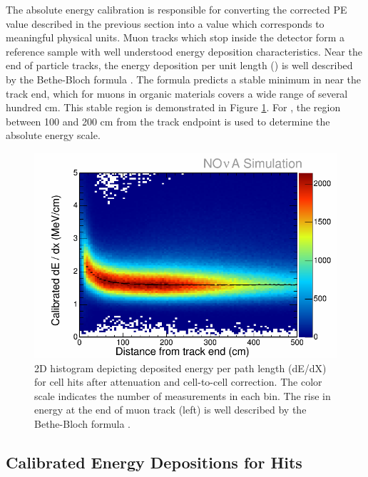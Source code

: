 The absolute energy calibration is responsible for converting the corrected
PE value described in the previous section into a value which corresponds
to meaningful physical units.
Muon tracks which stop inside the detector form a reference sample with well
understood energy deposition characteristics.
Near the end of particle tracks, the energy deposition per unit length
(\dedx) is well described by the Bethe-Bloch formula \cite{pdg}.
The formula predicts a stable minimum in \dedx near the track end,
which for muons in organic materials covers a wide range of several hundred cm.
This stable region is demonstrated in Figure \ref{calib_dEdX}.
For \nova, the region between 100 and 200 cm from the track endpoint is used
to determine the absolute energy scale.

\begin{figure}[t]
\begin{center}
\includegraphics[width=\textwidth]{figures/plots/reco/calib_dEdX.png}
\end{center}
\caption{2D histogram depicting deposited energy per path length (dE/dX) for
cell hits after attenuation and cell-to-cell correction.  The color scale
indicates the number of measurements in each bin.  The rise in energy at the
end of muon track (left) is well described by the Bethe-Bloch formula \cite{pdg}.}
\label{calib_dEdX}
\end{figure}

\subsection{Calibrated Energy Depositions for Hits}
\label{calib_atten_section}

